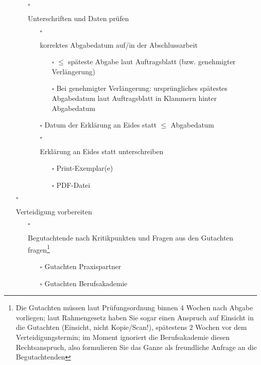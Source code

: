 \begin{itemize}
{\begin{itemize}
{            }
            \item[$\square$]{
                Unterschriften und Daten prüfen
                \begin{itemize}
                    \item[$\square$]{
                        korrektes Abgabedatum auf/in der Abschlussarbeit
                        \begin{itemize}
                            \item[$\square$] $\leq$ späteste Abgabe laut Auftragsblatt (bzw. genehmigter Verlängerung)
                            \item[$\square$] Bei genehmigter Verlängerung: ursprüngliches spätestes Abgabedatum laut Auftragsblatt in Klammern hinter Abgabedatum
                        \end{itemize}
                    }
                    \item[$\square$] Datum der Erklärung an Eides statt $\leq$ Abgabedatum
                    \item[$\square$]{
                        Erklärung an Eides statt unterschreiben
                        \begin{itemize}
                            \item[$\square$] Print-Exemplar(e)
                            \item[$\square$] PDF-Datei
                        \end{itemize}
                    }
                \end{itemize}
            }
        \end{itemize}
    }
    \item[$\square$]{
        Verteidigung vorbereiten
        \begin{itemize}
            \item[$\square$]{
                Begutachtende nach Kritikpunkten und Fragen aus den Gutachten fragen\footnote{Die Gutachten müssen laut Prüfungsordnung binnen $4$ Wochen nach Abgabe vorliegen; laut Rahmengesetz haben Sie sogar einen Anspruch auf Einsicht in die Gutachten (Einsicht, nicht Kopie/Scan!), spätestens $2$ Wochen vor dem Verteidigungstermin; im Moment ignoriert die Berufsakademie diesen Rechtsanspruch, also formulieren Sie das Ganze als freundliche Anfrage an die Begutachtenden}
                \begin{itemize}
                    \item[$\square$] Gutachten Praxispartner
                    \item[$\square$] Gutachten Berufsakademie

\end{itemize}}
\end{itemize}}
\end{itemize}

